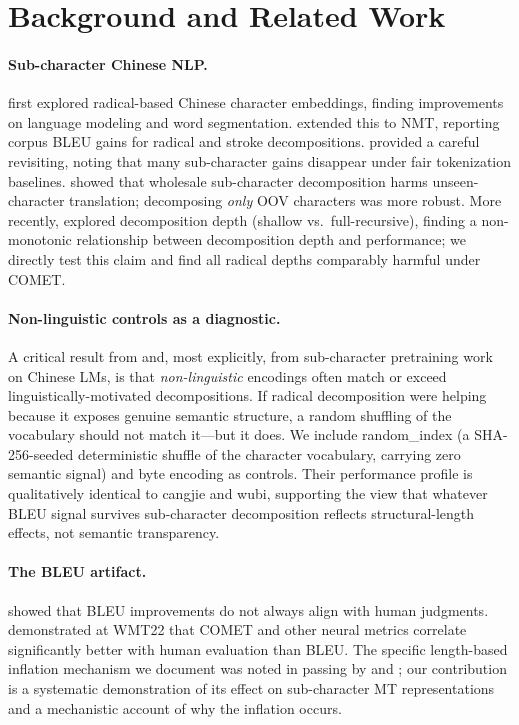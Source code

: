 \documentclass[11pt]{article}
\begin{document}
\section{Background and Related Work}
\label{sec:background}

\paragraph{Sub-character Chinese NLP.}
\citet{shi-etal-2015-radical} first explored radical-based Chinese character embeddings, finding improvements on language modeling and word segmentation. \citet{zhao-etal-2019-subchar} extended this to NMT, reporting corpus BLEU gains for radical and stroke decompositions. \citet{cherry-foster-2018-revisiting} provided a careful revisiting, noting that many sub-character gains disappear under fair tokenization baselines. \citet{saunders-etal-2020-subchar} showed that wholesale sub-character decomposition harms unseen-character translation; decomposing \textit{only} OOV characters was more robust. More recently, \citet{han-etal-2025-decomposition} explored decomposition depth (shallow vs.\ full-recursive), finding a non-monotonic relationship between decomposition depth and performance; we directly test this claim and find all radical depths comparably harmful under COMET.

\paragraph{Non-linguistic controls as a diagnostic.}
A critical result from \citet{cherry-foster-2018-revisiting} and, most explicitly, from sub-character pretraining work on Chinese LMs, is that \textit{non-linguistic} encodings often match or exceed linguistically-motivated decompositions. If radical decomposition were helping because it exposes genuine semantic structure, a random shuffling of the vocabulary should not match it---but it does. We include random\_index (a SHA-256-seeded deterministic shuffle of the character vocabulary, carrying zero semantic signal) and byte encoding as controls. Their performance profile is qualitatively identical to cangjie and wubi, supporting the view that whatever BLEU signal survives sub-character decomposition reflects structural-length effects, not semantic transparency.

\paragraph{The BLEU artifact.}
\citet{callison-burch-etal-2006-reevaluation} showed that BLEU improvements do not always align with human judgments. \citet{freitag-etal-2022-results} demonstrated at WMT22 that COMET and other neural metrics correlate significantly better with human evaluation than BLEU. The specific length-based inflation mechanism we document was noted in passing by \citet{post-2018-call} and \citet{kocmi-etal-2021-ship}; our contribution is a systematic demonstration of its effect on sub-character MT representations and a mechanistic account of why the inflation occurs.
\end{document}
